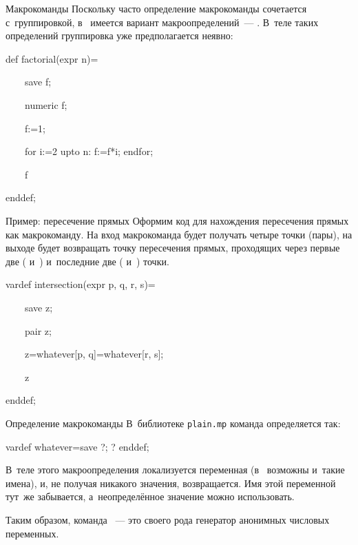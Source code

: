
\begin{frame}{Макрокоманды }
Поскольку часто определение макрокоманды сочетается с~группировкой,
в~ имеется вариант макроопределений~— . В~теле
таких определений группировка уже предполагается неявно:
\begin{programlisting}
\alert{def} factorial(expr n)=\par
{}%
\only<1-2>{~~~~}~~~~save f;\par
{}~~~~numeric f;\par
{}~~~~f:=1;\par
{}~~~~for i:=2 upto n: f:=f*i; endfor;\par
{}~~~~f\par
{}%
enddef;
\end{programlisting}
\end{frame}


\begin{frame}{Пример: пересечение прямых}
Оформим код для нахождения пересечения прямых как макрокоманду. На вход
макрокоманда будет получать четыре точки (пары), на выходе будет возвращать
точку пересечения прямых, проходящих через первые две (
и~) и~последние две ( и~) точки.
\begin{programlisting}
vardef intersection(expr p, q, r, s)=\par
~~~~save z;\par
~~~~pair z;\par
~~~~z=whatever[p, q]=whatever[r, s];\par
~~~~z\par
enddef;
\end{programlisting}
\end{frame}


\begin{frame}{Определение макрокоманды }
В~библиотеке \nolinkurl{plain.mp} команда  определяется так:
\begin{programlisting}
vardef whatever=save ?; ? enddef;
\end{programlisting}
В~теле этого макроопределения локализуется переменная 
(в~ возможны и~такие имена), и, не получая никакого значения,
возвращается. Имя этой переменной тут~же забывается, а~неопределённое значение
можно использовать.

Таким образом, команда ~— это своего рода генератор анонимных
числовых переменных.
\end{frame}

